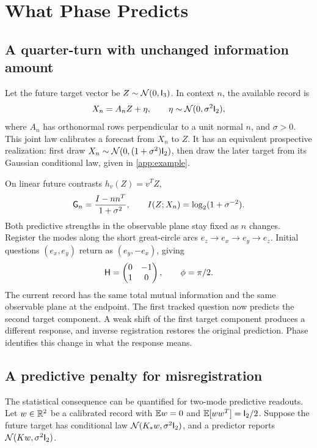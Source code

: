 \section{What Phase Predicts}
\label{sec:consequences}
\subsection{A quarter-turn with unchanged information amount}
Let the future target vector be \(Z\sim\mathcal N(0,\mathsf I_3)\). In context \(n\), the available record is
\begin{equation*}
X_n=A_nZ+\eta,\qquad \eta\sim\mathcal N(0,\sigma^2\mathsf I_2),
\end{equation*}
where \(A_n\) has orthonormal rows perpendicular to a unit normal \(n\), and \(\sigma>0\). This joint law calibrates a forecast from \(X_n\) to \(Z\). It has an equivalent prospective realization: first draw \(X_n\sim\mathcal N(0,(1+\sigma^2)\mathsf I_2)\), then draw the later target from its Gaussian conditional law, given in \cref{app:example}.

On linear future contrasts \(h_v(Z)=v^TZ\),
\begin{equation}
\mathsf G_n=\frac{I-nn^T}{1+\sigma^2},\qquad
I(Z;X_n)=\log_2(1+\sigma^{-2}).
\label{eq:example}
\end{equation}
Both predictive strengths in the observable plane stay fixed as \(n\) changes. Register the modes along the short great-circle arcs \(e_z\to e_x\to e_y\to e_z\). Initial questions \((e_x,e_y)\) return as \((e_y,-e_x)\), giving
\begin{equation*}
\mathsf H=\begin{pmatrix}0&-1\\1&0\end{pmatrix},\qquad\phi=\pi/2.
\end{equation*}
The current record has the same total mutual information and the same observable plane at the endpoint. The first tracked question now predicts the second target component. A weak shift of the first target component produces a different response, and inverse registration restores the original prediction. Phase identifies this change in what the response means.

\subsection{A predictive penalty for misregistration}
The statistical consequence can be quantified for two-mode predictive readouts. Let \(w\in\mathbb R^2\) be a calibrated record with \(\mathbb E w=0\) and \(\mathbb E[ww^T]=\mathsf I_2/2\). Suppose the future target has conditional law \(\mathcal N(K_*w,\sigma^2\mathsf I_2)\), and a predictor reports \(\mathcal N(Kw,\sigma^2\mathsf I_2)\).

